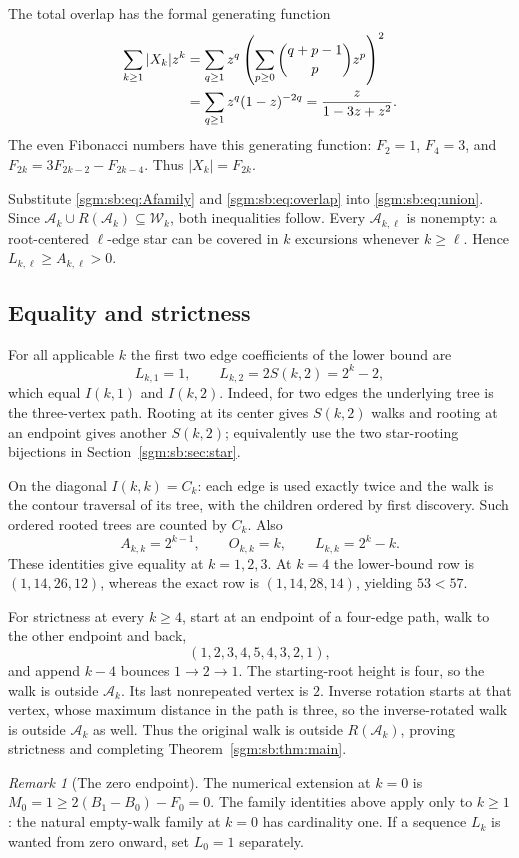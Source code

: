 \documentclass[11pt,letterpaper]{article}
\theoremstyle{remark}\newtheorem{remark}[theorem]{Remark}
\newcommand{\Wc}{\mathcal W}\newcommand{\Uc}{\mathcal U}\newcommand{\Part}{\operatorname{Part}}
\newcommand{\Ac}{\mathcal A}
\theoremstyle{definition}\newtheorem{definition}[theorem]{Definition}
\begin{document}
The total overlap has the formal generating function
\begin{align}
 \sum_{k\ge1}|X_k|z^k
 &=\sum_{q\ge1}z^q
   \left(\sum_{p\ge0}\binom{q+p-1}{p}z^p\right)^2\notag\\
 &=\sum_{q\ge1}z^q(1-z)^{-2q}
 =\frac{z}{1-3z+z^2}.\label{sgm:sb:eq:fibgf}
\end{align}
The even Fibonacci numbers have this generating function: $F_2=1$, $F_4=3$, and $F_{2k}=3F_{2k-2}-F_{2k-4}$. Thus $|X_k|=F_{2k}$.

Substitute \eqref{sgm:sb:eq:Afamily} and \eqref{sgm:sb:eq:overlap} into \eqref{sgm:sb:eq:union}. Since $\Ac_k\cup R(\Ac_k)\subseteq\Wc_k$, both inequalities follow. Every $\Ac_{k,\ell}$ is nonempty: a root-centered $\ell$-edge star can be covered in $k$ excursions whenever $k\ge\ell$. Hence $L_{k,\ell}\ge A_{k,\ell}>0$.

\subsection{Equality and strictness}
For all applicable $k$ the first two edge coefficients of the lower bound are
\[
 L_{k,1}=1,\qquad L_{k,2}=2S(k,2)=2^k-2,
\]
which equal $I(k,1)$ and $I(k,2)$. Indeed, for two edges the underlying tree is the three-vertex path. Rooting at its center gives $S(k,2)$ walks and rooting at an endpoint gives another $S(k,2)$; equivalently use the two star-rooting bijections in Section~\ref{sgm:sb:sec:star}.

On the diagonal $I(k,k)=C_k$: each edge is used exactly twice and the walk is the contour traversal of its tree, with the children ordered by first discovery. Such ordered rooted trees are counted by $C_k$. Also
\[
 A_{k,k}=2^{k-1},\qquad O_{k,k}=k,\qquad L_{k,k}=2^k-k.
\]
These identities give equality at $k=1,2,3$. At $k=4$ the lower-bound row is $(1,14,26,12)$, whereas the exact row is $(1,14,28,14)$, yielding $53<57$.

For strictness at every $k\ge4$, start at an endpoint of a four-edge path, walk to the other endpoint and back,
\[
 (1,2,3,4,5,4,3,2,1),
\]
and append $k-4$ bounces $1\to2\to1$. The starting-root height is four, so the walk is outside $\Ac_k$. Its last nonrepeated vertex is $2$. Inverse rotation starts at that vertex, whose maximum distance in the path is three, so the inverse-rotated walk is outside $\Ac_k$ as well. Thus the original walk is outside $R(\Ac_k)$, proving strictness and completing Theorem~\ref{sgm:sb:thm:main}.

\begin{remark}[The zero endpoint]
The numerical extension at $k=0$ is $M_0=1\ge 2(B_1-B_0)-F_0=0$. The family identities above apply only to $k\ge1$: the natural empty-walk family at $k=0$ has cardinality one. If a sequence $L_k$ is wanted from zero onward, set $L_0=1$ separately.
\end{remark}
\end{document}
